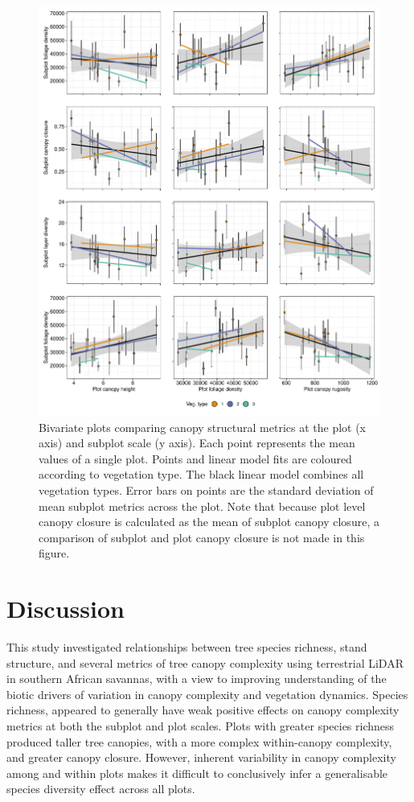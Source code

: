 \documentclass[11pt,a4paper]{article}
\begin{document}
\begin{figure}
	\includegraphics[width=\linewidth]{plot_subplot_bivar}
	\caption{Bivariate plots comparing canopy structural metrics at the plot (x axis) and subplot scale (y axis). Each point represents the mean values of a single plot. Points and linear model fits are coloured according to vegetation type. The black linear model combines all vegetation types. Error bars on points are the standard deviation of mean subplot metrics across the plot. Note that because plot level canopy closure is calculated as the mean of subplot canopy closure, a comparison of subplot and plot canopy closure is not made in this figure.}
	\label{plot_subplot_bivar}
\end{figure}

\section{Discussion}

This study investigated relationships between tree species richness, stand structure, and several metrics of tree canopy complexity using terrestrial LiDAR in southern African savannas, with a view to improving understanding of the biotic drivers of variation in canopy complexity and vegetation dynamics. Species richness, appeared to generally have weak positive effects on canopy complexity metrics at both the subplot and plot scales. Plots with greater species richness produced taller tree canopies, with a more complex within-canopy complexity, and greater canopy closure. However, inherent variability in canopy complexity among and within plots makes it difficult to conclusively infer a generalisable species diversity effect across all plots. 
\end{document}
